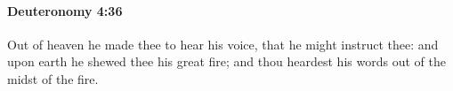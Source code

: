 
		\paragraph{Deuteronomy 4:36} %
			\label{DEUTERONOMY-4-36}

			Out of heaven he made thee to hear his voice, that he might instruct thee: and upon earth he shewed thee his great fire; and thou heardest his words out of the midst of the fire.


